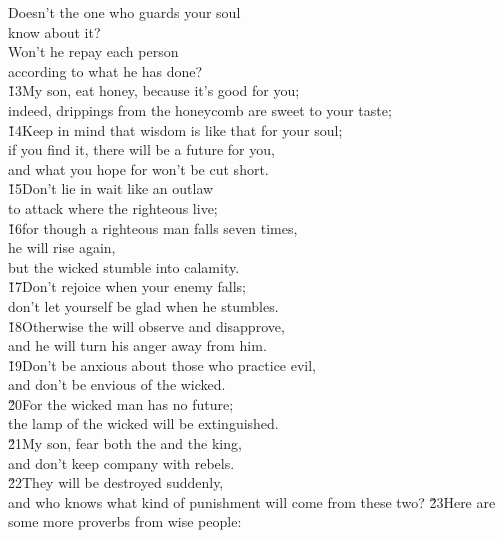 \begin{poetry}
\poeml Doesn't the one who guards your soul \\
\poemll    know about it? \\
\poeml Won't he repay each person \\
\poemll    according to what he has done? \\
\poeml \v{13}My son, eat honey, because it's good for you; \\
\poemll    indeed, drippings from the honeycomb are sweet to your taste; \\
\poeml \v{14}Keep in mind that wisdom is like that for your soul; \\
\poemll    if you find it, there will be a future for you, \\
\poemlll       and what you hope for won't be cut short. \\
\poeml \v{15}Don't lie in wait like an outlaw \\
\poemll    to attack where the righteous live; \\
\poeml \v{16}for though a righteous man falls seven times, \\
\poemll    he will rise again, \\
\poemlll       but the wicked stumble into calamity. \\
\poeml \v{17}Don't rejoice when your enemy falls; \\
\poemll    don't let yourself be glad when he stumbles. \\
\poeml \v{18}Otherwise the  will observe and disapprove, \\
\poemll    and he will turn his anger away from him. \\
\poeml \v{19}Don't be anxious about those who practice evil, \\
\poemll    and don't be envious of the wicked. \\
\poeml \v{20}For the wicked man has no future; \\
\poemll    the lamp of the wicked will be extinguished. \\
\poeml \v{21}My son, fear both the  and the king, \\
\poemll    and don't keep company with rebels. \\
\poeml \v{22}They will be destroyed suddenly, \\
\poemll    and who knows what kind of punishment will come from these two?
\poeml \v{23}Here are some more proverbs from wise people: \\

\end{poetry}
